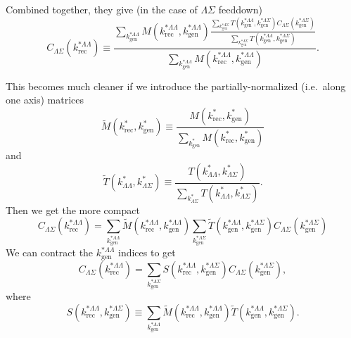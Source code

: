 Combined together, they give (in the case of $\Lambda\Sigma$ feeddown)
\begin{equation}
C_{\Lambda\Sigma}(k^{*\Lambda\Lambda}_{\mathrm{rec}}) \equiv \frac{\displaystyle\sum\limits_{k^{*\Lambda\Lambda}_{\mathrm{gen}}}M(k^{*\Lambda\Lambda}_{\mathrm{rec}},k^{*\Lambda\Lambda}_{\mathrm{gen}})
 \frac{\displaystyle\sum\limits_{k^{*\Lambda\Sigma}_{\mathrm{gen}}}T(k^{*\Lambda\Lambda}_\mathrm{gen},k^{*\Lambda\Sigma}_{\mathrm{gen}})C_{\Lambda\Sigma}(k^{*\Lambda\Sigma}_{\mathrm{gen}})}{\displaystyle\sum\limits_{k^{*\Lambda\Sigma}_{\mathrm{gen}}}T(k^{*\Lambda\Lambda}_\mathrm{gen},k^{*\Lambda\Sigma}_{\mathrm{gen}})}
}{\displaystyle\sum\limits_{k^{*\Lambda\Lambda}_{\mathrm{gen}}}M(k^{*\Lambda\Lambda}_{\mathrm{rec}},k^{*\Lambda\Lambda}_{\mathrm{gen}})}.
\end{equation}

This becomes much cleaner if we introduce the partially-normalized (i.e.\ along one axis) matrices
\begin{equation}
\tilde{M}(k^*_{\mathrm{rec}},k^*_{\mathrm{gen}}) \equiv \frac{M(k^*_{\mathrm{rec}},k^*_{\mathrm{gen}})}{\displaystyle\sum\limits_{k^*_{\mathrm{gen}}}M(k^*_{\mathrm{rec}},k^*_{\mathrm{gen}})}
\end{equation}
and
\begin{equation}
\tilde{T}(k^*_{\Lambda\Lambda},k^*_{\Lambda\Sigma}) \equiv \frac{T(k^*_{\Lambda\Lambda},k^*_{\Lambda\Sigma})}{\displaystyle\sum\limits_{k^*_{\Lambda\Sigma}}T(k^*_{\Lambda\Lambda},k^*_{\Lambda\Sigma})}.
\end{equation}
Then we get the more compact
\begin{equation}
C_{\Lambda\Sigma}(k^{*\Lambda\Lambda}_{\mathrm{rec}}) = \displaystyle\sum\limits_{k^{*\Lambda\Lambda}_{\mathrm{gen}}}\tilde{M}(k^{*\Lambda\Lambda}_{\mathrm{rec}},k^{*\Lambda\Lambda}_{\mathrm{gen}})\displaystyle\sum\limits_{k^{*\Lambda\Sigma}_{\mathrm{gen}}}\tilde{T}(k^{*\Lambda\Lambda}_\mathrm{gen},k^{*\Lambda\Sigma}_{\mathrm{gen}})C_{\Lambda\Sigma}(k^{*\Lambda\Sigma}_{\mathrm{gen}})
\end{equation}
We can contract the $k^{*\Lambda\Lambda}_\mathrm{gen}$ indices to get
\begin{equation}
\label{eq:FullSmearing}
C_{\Lambda\Sigma}(k^{*\Lambda\Lambda}_{\mathrm{rec}}) = \displaystyle\sum\limits_{k^{*\Lambda\Sigma}_{\mathrm{gen}}}S(k^{*\Lambda\Lambda}_{\mathrm{rec}},k^{*\Lambda\Sigma}_{\mathrm{gen}})C_{\Lambda\Sigma}(k^{*\Lambda\Sigma}_{\mathrm{gen}}),
\end{equation}
where 
\begin{equation}
\label{eq:SmearMatrix}
S(k^{*\Lambda\Lambda}_{\mathrm{rec}},k^{*\Lambda\Sigma}_{\mathrm{gen}}) \equiv \displaystyle\sum\limits_{k^{*\Lambda\Lambda}_{\mathrm{gen}}}\tilde{M}(k^{*\Lambda\Lambda}_{\mathrm{rec}},k^{*\Lambda\Lambda}_{\mathrm{gen}})\tilde{T}(k^{*\Lambda\Lambda}_\mathrm{gen},k^{*\Lambda\Sigma}_{\mathrm{gen}}).
\end{equation}

